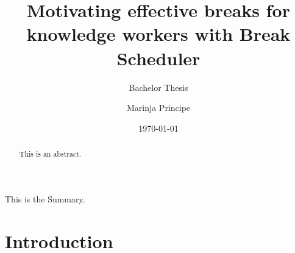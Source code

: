 \documentclass{hasel_thesis}
\date{\today}
\title{Motivating effective breaks for knowledge workers with Break  Scheduler }
\subtitle{Bachelor Thesis}
\author{Marinja Principe}
\begin{document}
\maketitle

\frontmatter

\begin{acknowledgements}
\end{acknowledgements}

\begin{abstract}
This is an abstract.
\end{abstract}

\begin{Summary}
This is the Summary.
\end{Summary}
    

\tableofcontents
\listoffigures
\listoftables
\lstlistoflistings

\mainmatter
\chapter{Introduction}

\end{document}
